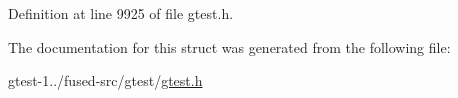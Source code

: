 \-Definition at line 9925 of file gtest.\-h.


\begin{DoxyCode}
{}
\end{DoxyCode}


\-The documentation for this struct was generated from the following file\-:\begin{DoxyCompactItemize}
\item 
gtest-\/1../fused-\/src/gtest/\hyperlink{fused-src_2gtest_2gtest_8h}{gtest.\-h}\end{DoxyCompactItemize}
